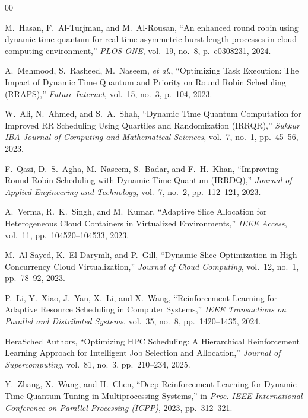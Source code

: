 \documentclass[journal]{IEEEtran}
\begin{document}
\begin{thebibliography}{00}

M.~Hasan, F.~Al-Turjman, and M.~Al-Rousan, ``An enhanced round robin using dynamic time quantum for real-time asymmetric burst length processes in cloud computing environment,'' \emph{PLOS ONE}, vol.~19, no.~8, p.~e0308231, 2024.

A.~Mehmood, S.~Rasheed, M.~Naseem, \emph{et al.}, ``Optimizing Task Execution: The Impact of Dynamic Time Quantum and Priority on Round Robin Scheduling (RRAPS),'' \emph{Future Internet}, vol.~15, no.~3, p.~104, 2023.

W.~Ali, N.~Ahmed, and S.~A.~Shah, ``Dynamic Time Quantum Computation for Improved RR Scheduling Using Quartiles and Randomization (IRRQR),'' \emph{Sukkur IBA Journal of Computing and Mathematical Sciences}, vol.~7, no.~1, pp.~45--56, 2023.

F.~Qazi, D.~S.~Agha, M.~Naseem, S.~Badar, and F.~H.~Khan, ``Improving Round Robin Scheduling with Dynamic Time Quantum (IRRDQ),'' \emph{Journal of Applied Engineering and Technology}, vol.~7, no.~2, pp.~112--121, 2023.

A.~Verma, R.~K.~Singh, and M.~Kumar, ``Adaptive Slice Allocation for Heterogeneous Cloud Containers in Virtualized Environments,'' \emph{IEEE Access}, vol.~11, pp.~104520--104533, 2023.

M.~Al-Sayed, K.~El-Darymli, and P.~Gill, ``Dynamic Slice Optimization in High-Concurrency Cloud Virtualization,'' \emph{Journal of Cloud Computing}, vol.~12, no.~1, pp.~78--92, 2023.

P.~Li, Y.~Xiao, J.~Yan, X.~Li, and X.~Wang, ``Reinforcement Learning for Adaptive Resource Scheduling in Computer Systems,'' \emph{IEEE Transactions on Parallel and Distributed Systems}, vol.~35, no.~8, pp.~1420--1435, 2024.

HeraSched Authors, ``Optimizing HPC Scheduling: A Hierarchical Reinforcement Learning Approach for Intelligent Job Selection and Allocation,'' \emph{Journal of Supercomputing}, vol.~81, no.~3, pp.~210--234, 2025.

Y.~Zhang, X.~Wang, and H.~Chen, ``Deep Reinforcement Learning for Dynamic Time Quantum Tuning in Multiprocessing Systems,'' in \emph{Proc. IEEE International Conference on Parallel Processing (ICPP)}, 2023, pp.~312--321.


\end{thebibliography}
\end{document}
